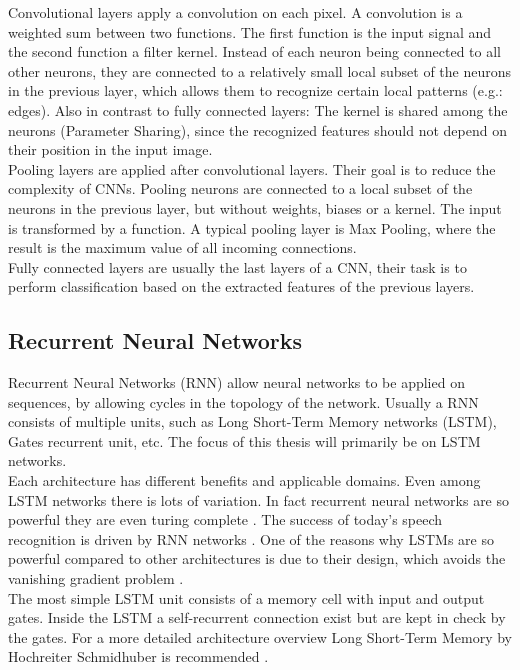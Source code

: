 \documentclass[draft,final,oneside]{vutinfth} %
\begin{document}
Convolutional layers apply a convolution on each pixel. A convolution is a weighted sum between two functions. The first function is the input signal and the second function a filter kernel. Instead of each neuron being connected to all other neurons, they are connected to a relatively small local subset of the neurons in the previous layer, which allows them to recognize certain local patterns (e.g.: edges). Also in contrast to fully connected layers: The kernel is shared among the neurons (Parameter Sharing), since the recognized features should not depend on their position in the input image. \\

Pooling layers are applied after convolutional layers. Their goal is to reduce the complexity of CNNs. Pooling neurons are connected to a local subset of the neurons in the previous layer, but without weights, biases or a kernel. The input is transformed by a function. A typical pooling layer is Max Pooling, where the result is the maximum value of all incoming connections. \\

Fully connected layers are usually the last layers of a CNN, their task is to perform classification based on the extracted features of the previous layers. \\

\subsection{Recurrent Neural Networks}
Recurrent Neural Networks (RNN) allow neural networks to be applied on sequences, by allowing cycles in the topology of the network. Usually a RNN consists of multiple units, such as Long Short-Term Memory networks (LSTM), Gates recurrent unit, etc. The focus of this thesis will primarily be on LSTM networks. \\

Each architecture has different benefits and applicable domains. Even among LSTM networks there is lots of variation. In fact recurrent neural networks are so powerful they are even turing complete \cite{seigelmann:computation}. The success of today's speech recognition is driven by RNN networks \cite{googlespeech}. One of the reasons why LSTMs are so powerful compared to other architectures is due to their design, which avoids the vanishing gradient problem \cite {vanishinggradient}.\\

The most simple LSTM unit consists of a memory cell with input and output gates. Inside the LSTM a self-recurrent connection exist but are kept in check by the gates. For a more detailed architecture overview Long Short-Term Memory by Hochreiter Schmidhuber is recommended \cite{hochreiter}.
\end{document}
